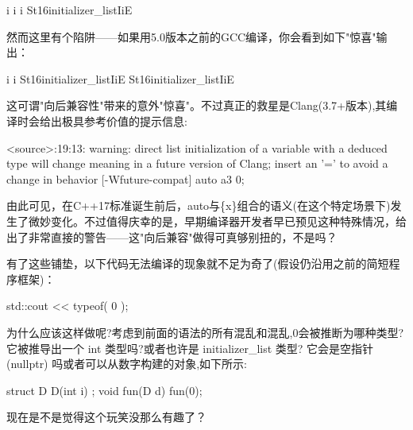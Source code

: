\begin{shell}
i 
i 
i
St16initializer_listIiE
\end{shell}

然而这里有个陷阱——如果用5.0版本之前的GCC编译，你会看到如下"惊喜"输出：

\begin{shell}
i 
i
St16initializer_listIiE
St16initializer_listIiE
\end{shell}

这可谓"向后兼容性"带来的意外"惊喜"。不过真正的救星是Clang(3.7+版本),其编译时会给出极具参考价值的提示信息:

\begin{shell}
<source>:19:13: warning: direct list initialization of a variable
with a deduced type will change meaning in a future version of Clang;
insert an '=' to avoid a change in behavior [-Wfuture-compat]
  auto a3 {0};
\end{shell}

由此可见，在C++17标准诞生前后，auto与\{x\}组合的语义(在这个特定场景下)发生了微妙变化。不过值得庆幸的是，早期编译器开发者早已预见这种特殊情况，给出了非常直接的警告——这"向后兼容"做得可真够别扭的，不是吗？

有了这些铺垫，以下代码无法编译的现象就不足为奇了(假设仍沿用之前的简短程序框架)：

\begin{cpp}
std::cout << typeof( {0} );
\end{cpp}

为什么应该这样做呢?考虑到前面的语法的所有混乱和混乱,{0}会被推断为哪种类型?它被推导出一个 int 类型吗?或者也许是 initializer\_list 类型? 它会是空指针 (nullptr) 吗或者可以从数字构建的对象,如下所示:

\begin{cpp}
struct D { D(int i) {} };
void fun(D d) { }
fun({0});
\end{cpp}

现在是不是觉得这个玩笑没那么有趣了？








